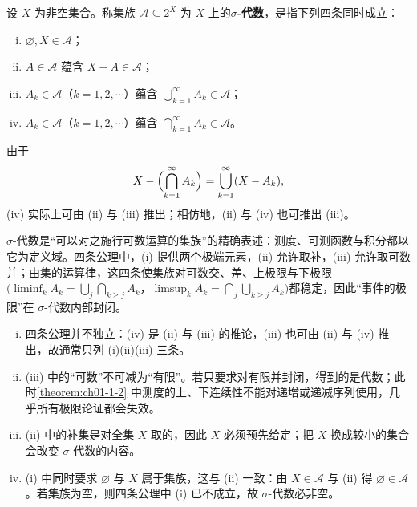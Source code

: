 \documentclass[../../main.tex]{subfiles}
\begin{document}
\begin{definition}[$\sigma$-代数]\label{definition:ch01-1-4}
设 $X$ 为非空集合。称集族 $\mathcal{A}\subseteq2^{X}$ 为 $X$ 上的\textbf{$\sigma$-代数}，是指下列四条同时成立：
\begin{enumerate}[(i)]
\item $\varnothing,X\in\mathcal{A}$；
\item $A\in\mathcal{A}$ 蕴含 $X-A\in\mathcal{A}$；
\item $A_{k}\in\mathcal{A}$（$k=1,2,\cdots$）蕴含 $\bigcup_{k=1}^{\infty}A_{k}\in\mathcal{A}$；
\item $A_{k}\in\mathcal{A}$（$k=1,2,\cdots$）蕴含 $\bigcap_{k=1}^{\infty}A_{k}\in\mathcal{A}$。
\end{enumerate}
\end{definition}

\begin{remark}\label{remark:ch01-def-1-4-冗余}
由于
\begin{align*}
X-\Bigl(\bigcap_{k=1}^{\infty}A_{k}\Bigr)=\bigcup_{k=1}^{\infty}(X-A_{k}),
\end{align*}
(iv) 实际上可由 (ii) 与 (iii) 推出；相仿地，(ii) 与 (iv) 也可推出 (iii)。
\end{remark}

\begin{remark}\label{remark:ch01-def-1-4-代数动机}
$\sigma$-代数是“可以对之施行可数运算的集族”的精确表述：测度、可测函数与积分都以它为定义域。四条公理中，(i) 提供两个极端元素，(ii) 允许取补，(iii) 允许取可数并；由集的运算律，这四条使集族对可数交、差、上极限与下极限$\bigl(\liminf_{k}A_{k}=\bigcup_{j}\bigcap_{k\geqslant j}A_{k}$，$\limsup_{k}A_{k}=\bigcap_{j}\bigcup_{k\geqslant j}A_{k}\bigr)$都稳定，因此“事件的极限”在 $\sigma$-代数内部封闭。
\end{remark}

\begin{remark}\label{remark:ch01-def-1-4-代数条件}
\begin{enumerate}[(i)]
\item 四条公理并不独立：(iv) 是 (ii) 与 (iii) 的推论，(iii) 也可由 (ii) 与 (iv) 推出，故通常只列 (i)(ii)(iii) 三条。
\item (iii) 中的“可数”不可减为“有限”。若只要求对有限并封闭，得到的是代数；此时\cref{theorem:ch01-1-2} 中测度的上、下连续性不能对递增或递减序列使用，几乎所有极限论证都会失效。%
\item (ii) 中的补集是对全集 $X$ 取的，因此 $X$ 必须预先给定；把 $X$ 换成较小的集合会改变 $\sigma$-代数的内容。
\item (i) 中同时要求 $\varnothing$ 与 $X$ 属于集族，这与 (ii) 一致：由 $X\in\mathcal{A}$ 与 (ii) 得 $\varnothing\in\mathcal{A}$。若集族为空，则四条公理中 (i) 已不成立，故 $\sigma$-代数必非空。
\end{enumerate}
\end{remark}
\end{document}
